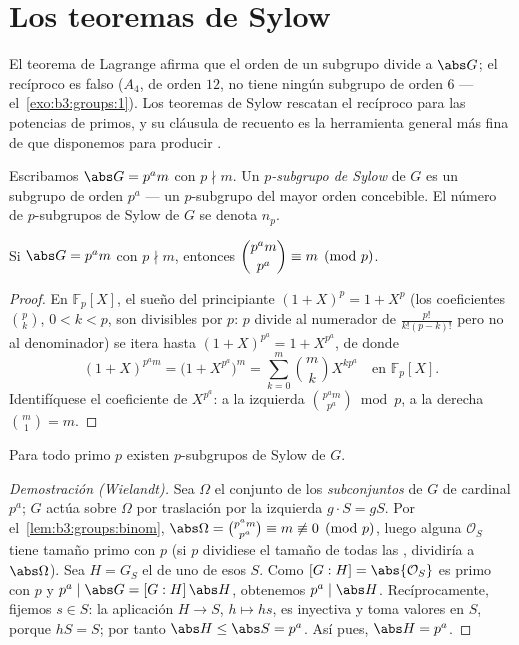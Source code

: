 \section{Los teoremas de Sylow}

El teorema de Lagrange afirma que el orden de un subgrupo divide a
$\abs G$; el recíproco es falso ($A_4$, de orden $12$, no tiene ningún
subgrupo de orden $6$ --- el~\cref{exo:b3:groups:1}). Los teoremas de
Sylow rescatan el recíproco para las potencias de primos, y su cláusula
de recuento es la herramienta general más fina de que disponemos para
producir .

\begin{definition}\label{def:b3:groups:sylow}
Escribamos $\abs G = p^a m$ con $p \nmid m$. Un \emph{$p$-subgrupo de
Sylow} de $G$ es un subgrupo de orden $p^a$ ---
un $p$-subgrupo del mayor orden concebible. El número de $p$-subgrupos
de Sylow de $G$ se denota $n_p$.
\end{definition}

\begin{lemma}\label{lem:b3:groups:binom}
Si $\abs G = p^a m$ con $p \nmid m$, entonces $\dbinom{p^a m}{p^a}
\equiv m \pmod p$.
\end{lemma}

\begin{proof}
En $\mathbb F_p[X]$, el sueño del principiante $(1+X)^p = 1 + X^p$ (los
coeficientes $\binom pk$, $0<k<p$, son divisibles por $p$: $p$ divide al
numerador de $\frac{p!}{k!(p-k)!}$ pero no al denominador) se itera
hasta $(1+X)^{p^a} = 1 + X^{p^a}$, de donde
\[
(1+X)^{p^a m} = \bigl(1 + X^{p^a}\bigr)^m
= \sum_{k=0}^{m} \binom mk X^{k p^a} \quad\text{en } \mathbb
F_p[X].
\]
Identifíquese el coeficiente de $X^{p^a}$: a la izquierda $\binom{p^a
m}{p^a} \bmod p$, a la derecha $\binom m1 = m$.
\end{proof}

\begin{theorem}\label{thm:b3:groups:sylow1}
Para todo primo $p$ existen $p$-subgrupos de Sylow de $G$.
\end{theorem}

\begin{proof}[Demostración (Wielandt)]
Sea $\Omega$ el conjunto de los \emph{subconjuntos} de $G$ de cardinal
$p^a$; $G$ actúa sobre $\Omega$ por traslación por la izquierda
$g \cdot S = gS$. Por el~\cref{lem:b3:groups:binom},
$\abs\Omega = \binom{p^a m}{p^a}
\equiv m \not\equiv 0 \pmod p$, luego alguna
 $\mathcal O_S$ tiene tamaño primo
con $p$ (si $p$ dividiese el tamaño de todas las
, dividiría a $\abs\Omega$). Sea
$H = G_S$ el  de uno de esos
$S$. Como $[G : H] = \abs{\mathcal O_S}$ es primo con $p$ y $p^a \mid
\abs G = [G:H]\,\abs H$, obtenemos $p^a \mid \abs H$. Recíprocamente,
fijemos $s \in S$: la aplicación $H \to S$, $h \mapsto hs$, es inyectiva
y toma valores en $S$, porque $hS = S$; por tanto
$\abs H \leq \abs S = p^a$. Así pues, $\abs H = p^a$.
\end{proof}

